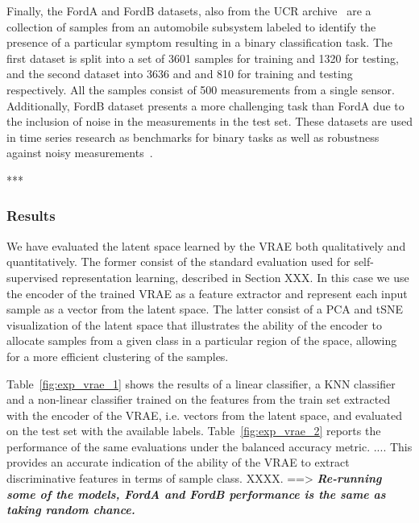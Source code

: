 Finally, the FordA and FordB datasets, also from the UCR archive~\cite{2019_IEEE_ucr} are a collection of samples from an automobile subsystem labeled to identify the presence of a particular symptom resulting in a binary classification task. The first dataset is split into a set of 3601 samples for training and 1320 for testing, and the second dataset into 3636 and and 810 for training and testing respectively. All the samples consist of 500 measurements from a single sensor. Additionally, FordB dataset presents a more challenging task than FordA due to the inclusion of noise in the measurements in the test set. These datasets are used in time series research as benchmarks for binary tasks as well as robustness against noisy measurements~\cite{2021_ICML_voice2series, 2022_arxiv_hypertime, 2023_Springer_deep}.

    *** 
            
\subsubsection{Results}\label{subsubsec:VRAE_Res}

We have evaluated the latent space learned by the VRAE both qualitatively and quantitatively. The former consist of the standard evaluation used for self-supervised representation learning, described in Section XXX. In this case we use the encoder of the trained VRAE as a feature extractor and represent each input sample as a vector from the latent space. The latter consist of a PCA and tSNE visualization of the latent space that illustrates the ability of the encoder to allocate samples from a given class in a particular region of the space, allowing for a more efficient clustering of the samples.

Table~\ref{fig:exp_vrae_1} shows the results of a linear classifier, a KNN classifier and a non-linear classifier trained on the features from the train set extracted with the encoder of the VRAE, i.e. vectors from the latent space, and evaluated on the test set with the available labels. Table~\ref{fig:exp_vrae_2} reports the performance of the same evaluations under the balanced accuracy metric. .... This provides an accurate indication of the ability of the VRAE to extract discriminative features in terms of sample class. XXXX. ==> \textbf{\textit{Re-running some of the models, FordA and FordB performance is the same as taking random chance.}}

